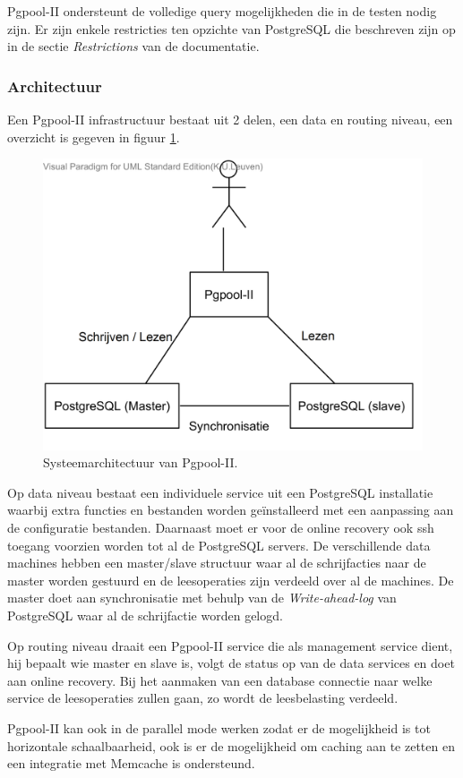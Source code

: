 Pgpool-II ondersteunt de volledige query mogelijkheden die in de testen nodig zijn. Er zijn enkele restricties ten opzichte van PostgreSQL die beschreven zijn op in de sectie \textit{Restrictions} van de documentatie\cite{pgpool-doc}. 

\subsubsection{Architectuur}
Een Pgpool-II infrastructuur bestaat uit 2 delen, een data en routing niveau, een overzicht is gegeven in figuur \ref{fig:Pgpool-structure}. 

\begin{figure}[h!]
\centering
\includegraphics[width=0.5\linewidth]{img/Pgpool-structuur}
\caption{Systeemarchitectuur van Pgpool-II.}
\label{fig:Pgpool-structure}
\end{figure}

Op data niveau bestaat een individuele service uit een PostgreSQL installatie waarbij extra functies en bestanden worden geïnstalleerd met een aanpassing aan de configuratie bestanden.  Daarnaast moet er voor de online recovery ook ssh toegang voorzien worden tot al de PostgreSQL servers. De verschillende data machines hebben een master/slave structuur waar al de schrijfacties naar de master worden gestuurd en de leesoperaties zijn verdeeld over al de machines. De master doet aan synchronisatie met behulp van de \textit{Write-ahead-log} van PostgreSQL waar al de schrijfactie worden gelogd. 

Op routing niveau draait een Pgpool-II service die als management service dient, hij bepaalt wie master en slave is, volgt de status op van de data services en doet aan online recovery. Bij het aanmaken van een database connectie naar welke service de leesoperaties zullen gaan, zo wordt de leesbelasting verdeeld. 

Pgpool-II kan ook in de parallel mode werken zodat er de mogelijkheid is tot horizontale schaalbaarheid, ook is er de mogelijkheid om caching aan te zetten en een integratie met Memcache is ondersteund. 

